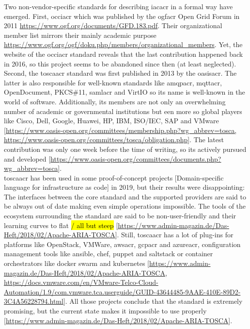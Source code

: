 Two non-vendor-specific standards for describing \gls{iacacr} in a formal way have emerged. First, \gls{occiacr} which was published by the \gls{ogfacr} Open Grid Forum in 2011 \url{https://www.ogf.org/documents/GFD.183.pdf}. Their organizational member list mirrors their mainly academic purpose \url{https://www.ogf.org/ogf/doku.php/members/organizational\_members}. Yet, the website of the \gls{occiacr} standard reveals that the last contribution happened back in 2016, so this project seems to be abandoned since then (at least neglected).
\\
Second, the \gls{toscaacr} standard was first published in 2013 by the \gls{oasisacr}. The latter is also responsible for well-known standards like \gls{amqpacr}, \gls{mqttacr}, OpenDocument, PKCS\#11, \gls{samlacr} and VirtIO so its name is well-known in the world of software. Additionally, its members are not only an overwhelming number of academic or governmental institutions but een more so global players like Cisco, Dell, Google, Huawei, HP, IBM, ISO/IEC, SAP and VMware [\url{https://www.oasis-open.org/committees/membership.php?wg\_abbrev=tosca, https://www.oasis-open.org/committees/tosca/obligation.php}]. The latest contribution was only one week before the time of writing, so its actively pursued and developed [\url{https://www.oasis-open.org/committees/documents.php?wg\_abbrev=tosca}].
\\
\gls{toscaacr} has been used in some proof-of-concept projects [Domain-specific language for infrastructure as code] in 2019, but their results were disappointing: The interfaces between the core standard and the supported providers are said to be always out of date making even simple operations impossible. The tools of the ecosystem surrounding the standard are said to be non-user-friendly and their learning curves to flat \hl{/ all but steep} [\url{https://www.admin-magazin.de/Das-Heft/2018/02/Apache-ARIA-TOSCA}].
Still, \gls{toscaacr} has a lot of plug-ins for platforms like OpenStack, VMWare, \gls{awsacr}, \gls{gcpacr} and \gls{azureacr}, configuration management tools like ansible, chef, puppet and saltstack or container orchestrators like docker swarm and kubernetes [\url{https://www.admin-magazin.de/Das-Heft/2018/02/Apache-ARIA-TOSCA}, \url{https://docs.vmware.com/en/VMware-Telco-Cloud-Automation/1.9/com.vmware.tca.userguide/GUID-43644485-9AAE-410E-89D2-3C4A56228794.html}].
All those projects conclude that the standard is extremely promising, but the current state makes it impossible to use properly [\url{https://www.admin-magazin.de/Das-Heft/2018/02/Apache-ARIA-TOSCA}].
